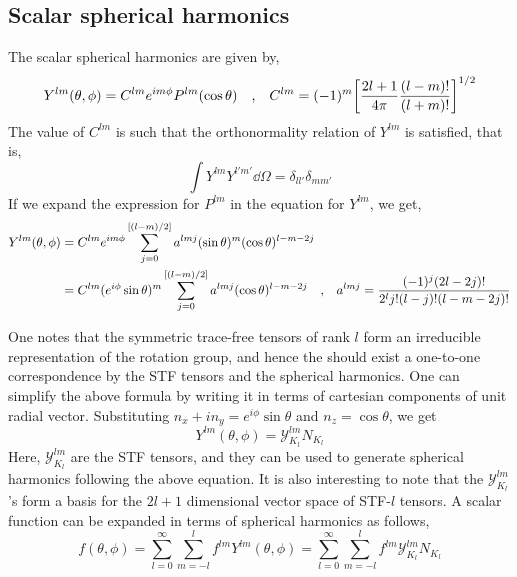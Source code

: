 \documentclass[a4paper,11pt]{article}
\begin{document}
\subsection{Scalar spherical harmonics}
The scalar spherical harmonics are given by,
\begin{equation*}
Y^{lm} (\theta , \phi) = C^{lm} e^{i m \phi} P^{lm} (\cos \theta) \qq{,} C^{lm} = (-1)^m \qty[\dfrac{2l + 1}{4 \pi} \dfrac{(l-m)!}{(l+m)!}]^{1/2}
\end{equation*}
The value of $ C^{lm} $ is such that the orthonormality relation of $ Y^{lm} $ is satisfied, that is,
\begin{equation*}
\int Y^{lm} Y^{l'm'} \dd{\Omega} = \delta_{ll'} \delta_{mm'}
\end{equation*}
If we expand the expression for $ P^{lm} $ in the equation for $ Y^{lm} $, we get,
\begin{align*}
Y^{lm} (\theta , \phi)&= C^{lm} e^{i  m\phi}  \sum_{j=0}^{[(l-m)/2]} a^{lmj} (\sin\theta)^m (\cos \theta)^{l-m-2j} \\
&= C^{lm} (e^{i  \phi} \sin \theta)^m \sum_{j=0}^{[(l-m)/2]} a^{lmj} (\cos \theta)^{l-m-2j}  \qq{,} a^{lmj} = \dfrac{(-1)^j (2l - 2j)!}{2^l j! (l-j)! (l-m-2j)!}
\end{align*}

One notes that the symmetric trace-free tensors of rank $ l $ form an irreducible representation of the rotation group, and hence the should exist a one-to-one correspondence by the STF tensors and the spherical harmonics. One can simplify the above formula by writing it in terms of cartesian components of unit radial vector. Substituting $ n_x + i n_y = e^{i  \phi} \sin \theta $ and $ n_z = \cos \theta $, we get
\begin{equation*}
Y^{lm} (\theta, \phi) = \mathcal{Y}^{lm}_{K_l} N_{K_l}
\end{equation*}
Here, $ \mathcal{Y}^{lm}_{K_l} $ are the STF tensors, and they can be used to generate spherical harmonics following the above equation. It is also interesting to note that the  $ \mathcal{Y}^{lm}_{K_l} $'s form a basis for the $ 2l+1 $ dimensional vector space of STF-$ l $ tensors. A scalar function can be expanded in terms of spherical harmonics as follows,
\begin{equation*}
f(\theta,\phi) =  \sum_{l = 0}^{\infty} \sum_{m=-l}^{l} f^{lm} Y^{lm} (\theta, \phi) = \sum_{l = 0}^{\infty} \sum_{m=-l}^{l} f^{lm} \mathcal{Y}^{lm}_{K_l} N_{K_l}
\end{equation*}
\end{document}
